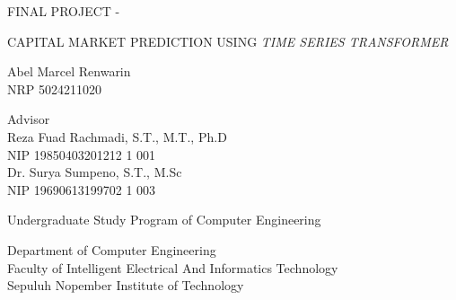 \begin{large}
  FINAL PROJECT - \coursecode{}
\end{large}

\vspace{\fill}

\begin{spacing}{1.5}
  \begin{Large}
    {CAPITAL MARKET PREDICTION USING \textit{TIME SERIES TRANSFORMER}}
  \end{Large}
\end{spacing}

\vspace{\fill}

\begin{large}
  {Abel Marcel Renwarin} \\
  \textmd{NRP {5024211020}}
\end{large}

\vspace{\fill}

\begin{large}
  \textmd{Advisor} \\
  {Reza Fuad Rachmadi, S.T., M.T., Ph.D} \\
  \textmd{NIP {19850403201212 1 001}} \\
  {Dr. Surya Sumpeno, S.T., M.Sc} \\
  \textmd{NIP {19690613199702 1 003}}
\end{large}

\vspace{\fill}

Undergraduate Study Program of {Computer Engineering} \\

\mdseries

Department of {Computer Engineering} \\
Faculty of Intelligent Electrical And Informatics Technology \\
Sepuluh Nopember Institute of Technology

\place{} \\ \the\year{}
